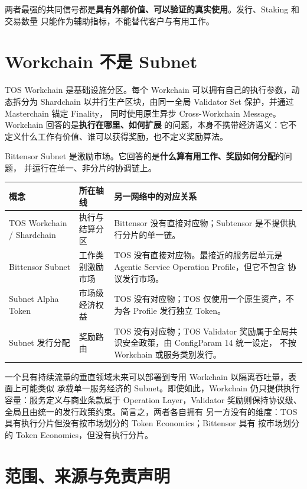 \documentclass[UTF8,11pt,fontset=fandol]{ctexart}
\begin{document}
两者最强的共同信号都是\textbf{具有外部价值、可以验证的真实使用}。发行、Staking 和交易数量
只能作为辅助指标，不能替代客户与有用工作。

\section{Workchain 不是 Subnet}

TOS Workchain 是基础设施分区。每个 Workchain 可以拥有自己的执行参数，动态拆分为
Shardchain 以并行生产区块，由同一全局 Validator Set 保护，并通过 Masterchain 锚定 Finality，
同时使用原生异步 Cross-Workchain Message。Workchain 回答的是\textbf{执行在哪里、如何扩展}
的问题，本身不携带经济语义：它不定义什么工作有价值、谁可以获得奖励，也不定义奖励算法。

Bittensor Subnet 是激励市场。它回答的是\textbf{什么算有用工作、奖励如何分配}的问题，
并运行在单一、非分片的协调链上。

\begin{longtable}{P{0.24\textwidth}P{0.24\textwidth}P{0.42\textwidth}}
\toprule
{}
概念 & 所在轴线 & 另一网络中的对应关系 \\
\midrule
\endhead
TOS Workchain / Shardchain &
执行与结算分区 &
Bittensor 没有直接对应物；Subtensor 是不提供执行分片的单一链。 \\
Bittensor Subnet &
工作类别激励市场 &
TOS 没有直接对应物。最接近的服务层单元是 Agentic Service Operation Profile，但它不包含
协议发行市场。 \\
Subnet Alpha Token &
市场级经济权益 &
TOS 没有对应物；TOS 仅使用一个原生资产，不为各 Profile 发行独立 Token。 \\
Subnet 发行分配 &
奖励路由 &
TOS 没有对应物；TOS Validator 奖励属于全局共识安全政策，由 ConfigParam 14 统一设定，
不按 Workchain 或服务类别发行。 \\
\bottomrule
\end{longtable}

一个具有持续流量的垂直领域未来可以部署到专用 Workchain 以隔离吞吐量，表面上可能类似
承载单一服务经济的 Subnet。即使如此，Workchain 仍只提供执行容量：服务定义与商业条款属于
Operation Layer，Validator 奖励则保持协议级、全局且由统一的发行政策约束。简言之，两者各自拥有
另一方没有的维度：TOS 具有执行分片但没有按市场划分的 Token Economics；Bittensor 具有
按市场划分的 Token Economics，但没有执行分片。

\section{范围、来源与免责声明}
\end{document}
